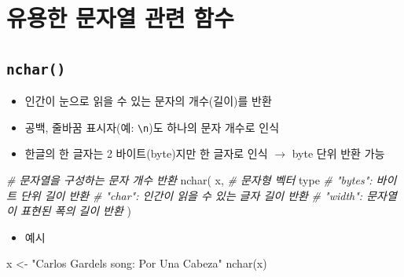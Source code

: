 \documentclass[
  11pt,
]{krantz}
\newenvironment{Shaded}{\begin{snugshade}}{\end{snugshade}}
\newcommand{\CommentTok}[1]{\textcolor[rgb]{0.37,0.37,0.37}{\textit{#1}}}
\newcommand{\FunctionTok}[1]{\textcolor[rgb]{0,0,0}{#1}}
\newcommand{\NormalTok}[1]{#1}
\newcommand{\OtherTok}[1]{\textcolor[rgb]{0.37,0.37,0.37}{#1}}
\newcommand{\StringTok}[1]{\textcolor[rgb]{0.5,0.5,0.5}{#1}}
\providecommand{\tightlist}{%
  \setlength{\itemsep}{0pt}\setlength{\parskip}{0pt}}
\begin{document}
\normalsize

\hypertarget{uxc720uxc6a9uxd55c-uxbb38uxc790uxc5f4-uxad00uxb828-uxd568uxc218}{%
\section{유용한 문자열 관련 함수}\label{uxc720uxc6a9uxd55c-uxbb38uxc790uxc5f4-uxad00uxb828-uxd568uxc218}}

\hypertarget{nchar}{%
\subsection{\texorpdfstring{\textbf{\texttt{nchar()}}}{nchar()}}\label{nchar}}

\begin{itemize}
\tightlist
\item
  인간이 눈으로 읽을 수 있는 문자의 개수(길이)를 반환
\item
  공백, 줄바꿈 표시자(예: \texttt{\textbackslash{}n})도 하나의 문자 개수로 인식
\item
  한글의 한 글자는 2 바이트(byte)지만 한 글자로 인식 \(\rightarrow\) byte 단위 반환 가능
\end{itemize}

\footnotesize

\begin{Shaded}
\begin{Highlighting}[]
\CommentTok{\# 문자열을 구성하는 문자 개수 반환}
\FunctionTok{nchar}\NormalTok{(}
\NormalTok{  x, }\CommentTok{\# 문자형 벡터}
\NormalTok{  type }\CommentTok{\# "bytes": 바이트 단위 길이 반환}
       \CommentTok{\# "char": 인간이 읽을 수 있는 글자 길이 반환}
       \CommentTok{\# "width": 문자열이 표현된 폭의 길이 반환}
\NormalTok{)}
\end{Highlighting}
\end{Shaded}

\normalsize

\begin{itemize}
\tightlist
\item
  예시
\end{itemize}

\footnotesize

\begin{Shaded}
\begin{Highlighting}[]
\NormalTok{x }\OtherTok{\textless{}{-}} \StringTok{"Carlos Gardel\textquotesingle{}s song: Por Una Cabeza"}
\FunctionTok{nchar}\NormalTok{(x)}
\end{Highlighting}
\end{Shaded}
\end{document}
